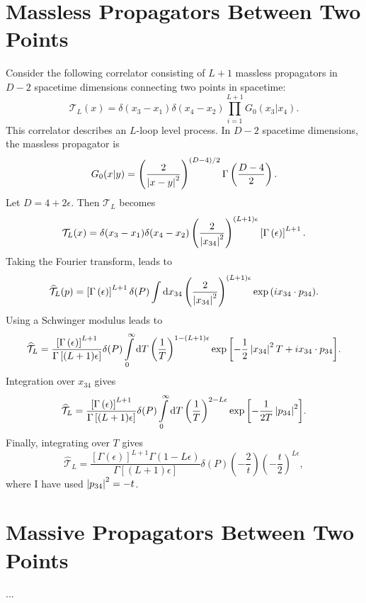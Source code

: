 \section{Massless Propagators Between Two Points}
Consider the following correlator consisting of $L + 1$ massless propagators in $D - 2$ spacetime dimensions connecting two points in spacetime:
\begin{equation}
	\mathcal{T}_{L}(x) = \delta(x_{3} - x_{1}) \delta(x_{4} - x_{2}) \prod_{i = 1}^{L+1} G_{0}(x_{3}|x_{4}).
\end{equation}
This correlator describes an $L$-loop level process. In $D - 2$ spacetime dimensions, the massless propagator is
\begin{equation}
	G_{0}(x|y) = \left( \frac{2}{\left\lvert x - y \right\rvert^{2}} \right)^{(D - 4)/2} \Gamma\left( \frac{D - 4}{2} \right).
\end{equation}
Let $D = 4 + 2 \epsilon$. Then $\mathcal{T}_{L}$ becomes
\begin{equation}
	\mathcal{T}_{L}(x) = \delta(x_{3} - x_{1}) \delta(x_{4} - x_{2}) \left( \frac{2}{\left\lvert x_{34} \right\rvert^{2}} \right)^{(L+1)\epsilon} \left[ \Gamma\left( \epsilon \right) \right]^{L+1}.
\end{equation}
Taking the Fourier transform, leads to
\begin{equation}
	\widehat{\mathcal{T}}_{L}(p) = \left[ \Gamma\left( \epsilon \right) \right]^{L+1} \delta(P) \int \mathrm{d}x_{34} \left( \frac{2}{\left\lvert x_{34} \right\rvert^{2}} \right)^{(L+1)\epsilon} \exp{\left( i x_{34} \cdot p_{34} \right)}.
\end{equation}
Using a Schwinger modulus leads to
\begin{equation}
	\widehat{\mathcal{T}}_{L} = \frac{\left[ \Gamma\left( \epsilon \right) \right]^{L+1}}{\Gamma\left[ (L+1)\epsilon \right]} \delta(P) \int\limits_{0}^{\infty} \mathrm{d}T \left( \frac{1}{T} \right)^{1 - (L+1)\epsilon} \exp{\left[ - \frac{1}{2} \left\lvert x_{34} \right\rvert^{2} T + i x_{34} \cdot p_{34} \right]}.
\end{equation}
Integration over $x_{34}$ gives
\begin{equation}
	\widehat{\mathcal{T}}_{L} = \frac{\left[ \Gamma\left( \epsilon \right) \right]^{L+1}}{\Gamma\left[ (L+1)\epsilon \right]} \delta(P) \int\limits_{0}^{\infty} \mathrm{d}T \left( \frac{1}{T} \right)^{2 - L\epsilon} \exp{\left[ - \frac{1}{2T} \left\lvert p_{34} \right\rvert^{2} \right]}.
\end{equation}
Finally, integrating over $T$ gives
\begin{equation}
	\widehat{\mathcal{T}}_{L} = \frac{\left[ \Gamma\left( \epsilon \right) \right]^{L+1} \Gamma(1 - L\epsilon) }{\Gamma\left[ (L+1)\epsilon \right]} \delta(P) \left(- \frac{2}{t} \right) \left( - \frac{t}{2} \right)^{L\epsilon},
\end{equation}
where I have used $\left\lvert p_{34} \right\rvert^{2} = -t$.
\section{Massive Propagators Between Two Points}
...